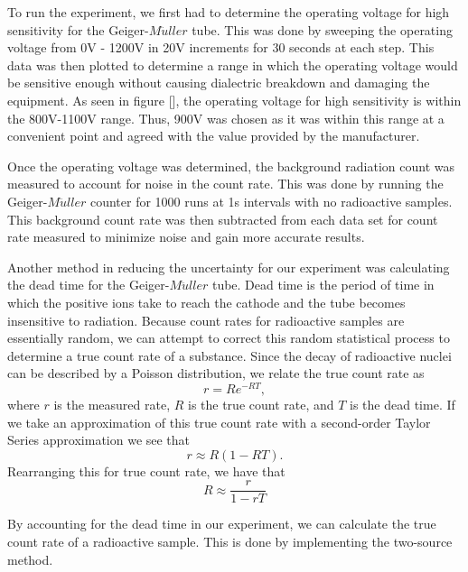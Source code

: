 
\par \indent To run the experiment, we first had to determine the operating voltage for high sensitivity for the Geiger-$M\ddot{u}ller$ tube. This was done by sweeping the operating voltage from 0V - 1200V in 20V increments for 30 seconds at each step. This data was then plotted to determine a range in which the operating voltage would be sensitive enough without causing dialectric breakdown and damaging the equipment. As seen in figure [], the operating voltage for high sensitivity is within the 800V-1100V range. Thus, 900V was chosen as it was within this range at a convenient point and agreed with the value provided by the manufacturer.


\par Once the operating voltage was determined, the background radiation count was measured to account for noise in the count rate. This was done by running the Geiger-$M\ddot{u}ller$ counter for 1000 runs at 1s intervals with no radioactive samples. This background count rate was then subtracted from each data set for count rate measured to minimize noise and gain more accurate results.

\par Another method in reducing the uncertainty for our experiment was calculating the dead time for the Geiger-$M\ddot{u}ller$ tube. Dead time is the period of time in which the positive ions take to reach the cathode and the tube becomes insensitive to radiation. Because count rates for radioactive samples are essentially random, we can attempt to correct this random statistical process to determine a true count rate of a substance.  Since the decay of radioactive nuclei can be described by a Poisson distribution, we relate the true count rate as
\begin{equation}
r = Re^{-RT},
\label{eq:ActualCountRate}
\end{equation}
where $r$ is the measured rate, $R$ is the true count rate, and $T$ is the dead time. If we take an approximation of this true count rate with a second-order Taylor Series approximation we see that
\begin{equation}
r \approx R(1-RT).
\label{eq:ApproxCountRate}
\end{equation}
Rearranging this for true count rate, we have that
\begin{equation}
R \approx \frac{r}{1-rT}
\label{eq:TrueCountRate}
\end{equation}

\par By accounting for the dead time in our experiment, we can calculate the true count rate of a radioactive sample. This is done by implementing the two-source method.

